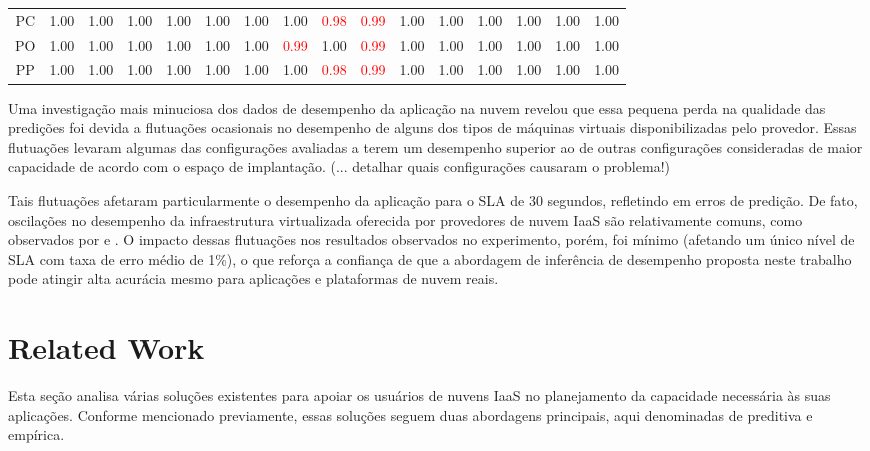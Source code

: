 \documentclass[10pt,conference,compsocconf]{IEEEtran}
\begin{document}
\begin{table}[t]
\begin{tabular}{|c|*{5}{ccc|}}
    PC    & 1.00  & 1.00  & 1.00  & 1.00  & 1.00  & 1.00  & 1.00  & \textcolor{red}{0.98}  & \textcolor{red}{0.99}  & 1.00  & 1.00  & 1.00  & 1.00  & 1.00  & 1.00 \\
    PO    & 1.00  & 1.00  & 1.00  & 1.00  & 1.00  & 1.00  & \textcolor{red}{0.99}  & 1.00  & \textcolor{red}{0.99}  & 1.00  & 1.00  & 1.00  & 1.00  & 1.00  & 1.00 \\
    PP    & 1.00  & 1.00  & 1.00  & 1.00  & 1.00  & 1.00  & 1.00  & \textcolor{red}{0.98}  & \textcolor{red}{0.99}  & 1.00  & 1.00  & 1.00  & 1.00  & 1.00  & 1.00 \\
    \hline
    \end{tabular}%
 \end{table}%

Uma investigação mais minuciosa dos dados de desempenho da aplicação na nuvem revelou que essa pequena perda na qualidade das predições foi devida a flutuações ocasionais no desempenho de alguns dos tipos de máquinas virtuais disponibilizadas pelo provedor. Essas flutuações levaram algumas das configurações avaliadas a terem um desempenho superior ao de outras configurações consideradas de maior capacidade de acordo com o espaço de implantação. (... detalhar quais configurações causaram o problema!)

Tais flutuações afetaram particularmente o desempenho da aplicação para o SLA de 30 segundos, refletindo em erros de predição. De fato, oscilações no desempenho da infraestrutura virtualizada oferecida por provedores de nuvem IaaS são relativamente comuns, como observados por \cite{iosup2011performance} e \cite{cunha2011investigating}. O impacto dessas flutuações nos resultados observados no experimento, porém, foi mínimo (afetando um único nível de SLA com taxa de erro médio de 1\%), o que reforça a confiança de que a abordagem de inferência de desempenho proposta neste trabalho pode atingir alta acurácia mesmo para aplicações e plataformas de nuvem reais.  


\section{Related Work}\label{sec:related-work}

Esta seção analisa várias soluções existentes para apoiar os usuários de nuvens IaaS no planejamento da capacidade necessária às suas aplicações. Conforme mencionado previamente, essas soluções seguem duas abordagens principais, aqui denominadas de preditiva e empírica. 
\end{document}
